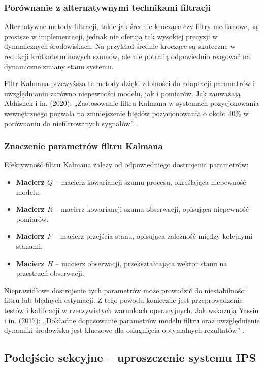 \subsubsection{Porównanie z alternatywnymi technikami filtracji}

Alternatywne metody filtracji, takie jak średnie kroczące czy filtry medianowe, są prostsze w implementacji, jednak nie oferują tak wysokiej precyzji w dynamicznych środowiskach. Na przykład średnie kroczące są skuteczne w redukcji krótkoterminowych szumów, ale nie potrafią odpowiednio reagować na dynamiczne zmiany stanu systemu.

Filtr Kalmana przewyższa te metody dzięki zdolności do adaptacji parametrów i uwzględnianiu zarówno niepewności modelu, jak i pomiarów. 
Jak zauważają Abhishek i in. (2020): „Zastosowanie filtru Kalmana w systemach pozycjonowania wewnętrznego pozwala na zmniejszenie błędów pozycjonowania o około 40\% w porównaniu do niefiltrowanych sygnałów” \cite{Abhishek2020}.

\subsubsection{Znaczenie parametrów filtru Kalmana}

Efektywność filtru Kalmana zależy od odpowiedniego dostrojenia parametrów:
\begin{itemize}
    \item \textbf{Macierz $Q$} – macierz kowariancji szumu procesu, określająca niepewność modelu.
    \item \textbf{Macierz $R$} – macierz kowariancji szumu obserwacji, opisująca niepewność pomiarów.
    \item \textbf{Macierz $F$} – macierz przejścia stanu, opisująca zależność między kolejnymi stanami.
    \item \textbf{Macierz $H$} – macierz obserwacji, przekształcająca wektor stanu na przestrzeń obserwacji.
\end{itemize}

Nieprawidłowe dostrojenie tych parametrów może prowadzić do niestabilności filtru lub błędnych estymacji. Z tego powodu konieczne jest przeprowadzenie testów i kalibracji w rzeczywistych warunkach operacyjnych. Jak wskazują Yassin i in. (2017): „Dokładne dopasowanie parametrów modelu filtru oraz uwzględnienie dynamiki środowiska jest kluczowe dla osiągnięcia optymalnych rezultatów” \cite{Yassin2017}.

\subsection{Podejście sekcyjne – uproszczenie systemu IPS}


